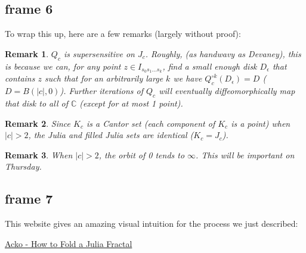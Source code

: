 \documentclass[xcolor=x11names,compress]{beamer}
\renewcommand{\(}{\begin{columns}}
\renewcommand{\)}{\end{columns}}
\newcommand{\<}[1]{\begin{column}{#1}}
\renewcommand{\>}{\end{column}}
\newtheorem{rmk}{Remark}
\begin{document}
\subsection{frame 6}
\begin{frame}

To wrap this up, here are a few remarks (largely without proof):

\vspace{.1cm}
\pause

\begin{rmk}
$Q_c$ is supersensitive on $J_c$. Roughly, (as handwavy as Devaney), this is because we can, for any point $z \in I_{s_0s_1\ldots s_k}$, find a small enough disk $D_{\epsilon}$ that contains $z$ such that for an arbitrarily large $k$ we have $Q_c^{\circ k}(D_{\epsilon}) = D$ ($D = B(|c|,0)$). Further iterations of $Q_c$ will eventually diffeomorphically map that disk to 
all of $\mathbb{C}$ (except for at most 1 point).
\end{rmk}

\pause

\begin{rmk}
Since $K_c$ is a Cantor set (each component of $K_c$ is a point) when $|c| > 2$, the Julia and filled Julia sets are identical ($K_c = J_c$).
\end{rmk}

\pause

\begin{rmk}
When $|c| > 2$, the orbit of 0 tends to $\infty$. This will be important on Thursday.
\end{rmk}

\end{frame}





\subsection{frame 7}
\begin{frame}


This website gives an amazing visual intuition for the process we just described:

\vspace{.5cm}



\begin{itemize}
{\color{DeepSkyBlue4}
	\item \href{http://acko.net/blog/how-to-fold-a-julia-fractal/}{Acko - How to Fold a Julia Fractal}
}
\end{itemize}

\end{frame}
\end{document}
